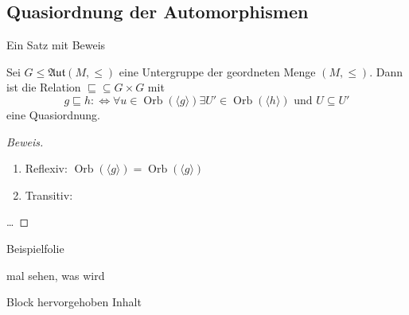 \documentclass[presentation,t]{beamer}
\DeclareMathOperator\Orb{Orb}%
\begin{document}
\subsection{Quasiordnung der Automorphismen}
\label{sec:orgc392e48}
\begin{frame}[label={sec:org504087b}]{Ein Satz mit Beweis}
\begin{theorem}[Quasiordnung]
Sei \(G\leq \mathfrak{Aut}(M,\leq)\) eine Untergruppe der geordneten
Menge \((M,\leq)\). Dann ist die Relation \({\sqsubseteq}\subseteq
G\times G\) mit 
\[
g\sqsubseteq h :\Leftrightarrow ∀u∈\Orb(〈g〉)∃U'∈\Orb(〈h〉)\text{ und }U\subseteq U'
\]
eine Quasiordnung.
\end{theorem}

\begin{proof}[Beweis]
\begin{enumerate}
\item Reflexiv: \(\Orb(〈g〉) = \Orb(〈g〉)\)
\item Transitiv:
\end{enumerate}
\dots
\end{proof}
\end{frame}
\begin{frame}[label={sec:org3ded075}]{Beispielfolie}
\begin{example}[Beispieltitel]
mal sehen, was wird
\end{example}
\begin{alertblock}{Block hervorgehoben}
Inhalt
\end{alertblock}
\end{frame}
\end{document}
